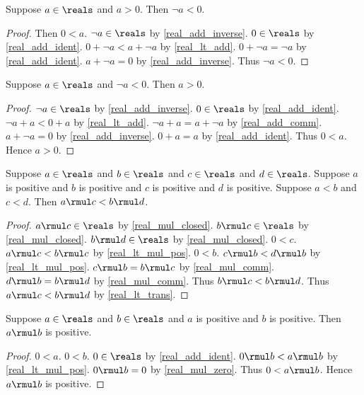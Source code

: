 \begin{theorem}\label{real_pos_imp_neg}
    Suppose $a\in\reals$ and $a > 0$.
    Then $\neg{a} < 0$.
\end{theorem}
\begin{proof}
    Then $0 < a$.
    $\neg{a}\in\reals$ by \cref{real_add_inverse}.
    $0\in\reals$ by \cref{real_add_ident}.
    $0 + \neg{a} < a + \neg{a}$ by \cref{real_lt_add}.
    $0 + \neg{a} = \neg{a}$ by \cref{real_add_ident}.
    $a + \neg{a} = 0$ by \cref{real_add_inverse}.
    Thus $\neg{a} < 0$.
\end{proof}

\begin{theorem}\label{real_neg_imp_pos}
    Suppose $a\in\reals$ and $\neg{a} < 0$.
    Then $a > 0$.
\end{theorem}
\begin{proof}
    $\neg{a}\in\reals$ by \cref{real_add_inverse}.
    $0\in\reals$ by \cref{real_add_ident}.
    $\neg{a} + a < 0 + a$ by \cref{real_lt_add}.
    $\neg{a} + a = a + \neg{a}$ by \cref{real_add_comm}.
    $a + \neg{a} = 0$ by \cref{real_add_inverse}.
    $0 + a = a$ by \cref{real_add_ident}.
    Thus $0 < a$.
    Hence $a > 0$.
\end{proof}

\begin{theorem}\label{real_lt_mul_pos_two}
    Suppose $a\in\reals$ and $b\in\reals$ and $c\in\reals$ and $d\in\reals$.
    Suppose $a$ is positive and $b$ is positive and $c$ is positive and $d$ is positive.
    Suppose $a < b$ and $c < d$.
    Then $a \rmul c < b \rmul d$.
\end{theorem}
\begin{proof}
    $a \rmul c\in\reals$ by \cref{real_mul_closed}.
    $b \rmul c\in\reals$ by \cref{real_mul_closed}.
    $b \rmul d\in\reals$ by \cref{real_mul_closed}.
    $0 < c$.
    $a \rmul c < b \rmul c$ by \cref{real_lt_mul_pos}.
    $0 < b$.
    $c \rmul b < d \rmul b$ by \cref{real_lt_mul_pos}.
    $c \rmul b = b \rmul c$ by \cref{real_mul_comm}.
    $d \rmul b = b \rmul d$ by \cref{real_mul_comm}.
    Thus $b \rmul c < b \rmul d$.
    Thus $a \rmul c < b \rmul d$ by \cref{real_lt_trans}.
\end{proof}

\begin{lemma}\label{real_mul_pos_pos}
    Suppose $a\in\reals$ and $b\in\reals$ and $a$ is positive and $b$ is positive.
    Then $a \rmul b$ is positive.
\end{lemma}
\begin{proof}
    $0 < a$.
    $0 < b$.
    $0\in\reals$ by \cref{real_add_ident}.
    $0 \rmul b < a \rmul b$ by \cref{real_lt_mul_pos}.
    $0 \rmul b = 0$ by \cref{real_mul_zero}.
    Thus $0 < a \rmul b$.
    Hence $a \rmul b$ is positive.
\end{proof}

